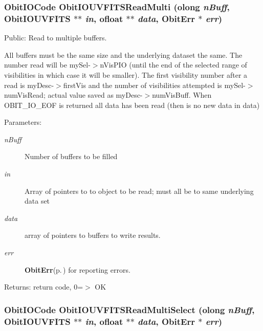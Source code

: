 \subsubsection{\setlength{\rightskip}{0pt plus 5cm}Obit\-IOCode Obit\-IOUVFITSRead\-Multi ({\bf olong} {\em n\-Buff}, {\bf Obit\-IOUVFITS} $\ast$$\ast$ {\em in}, {\bf ofloat} $\ast$$\ast$ {\em data}, {\bf Obit\-Err} $\ast$ {\em err})}\label{ObitIOUVFITS_8c_a29}


Public: Read to multiple buffers. 

All buffers must be the same size and the underlying dataset the same. The number read will be my\-Sel-$>$n\-Vis\-PIO (until the end of the selected range of visibilities in which case it will be smaller). The first visibility number after a read is my\-Desc-$>$first\-Vis and the number of visibilities attempted is my\-Sel-$>$num\-Vis\-Read; actual value saved as my\-Desc-$>$num\-Vis\-Buff. When OBIT\_\-IO\_\-EOF is returned all data has been read (then is no new data in data) \begin{Desc}
\item[Parameters:]
\begin{description}
\item[{\em n\-Buff}]Number of buffers to be filled \item[{\em in}]Array of pointers to to object to be read; must all be to same underlying data set \item[{\em data}]array of pointers to buffers to write results. \item[{\em err}]{\bf Obit\-Err}{\rm (p.\,\pageref{structObitErr})} for reporting errors. \end{description}
\end{Desc}
\begin{Desc}
\item[Returns:]return code, 0=$>$ OK \end{Desc}
\subsubsection{\setlength{\rightskip}{0pt plus 5cm}Obit\-IOCode Obit\-IOUVFITSRead\-Multi\-Select ({\bf olong} {\em n\-Buff}, {\bf Obit\-IOUVFITS} $\ast$$\ast$ {\em in}, {\bf ofloat} $\ast$$\ast$ {\em data}, {\bf Obit\-Err} $\ast$ {\em err})}\label{ObitIOUVFITS_8c_a31}


